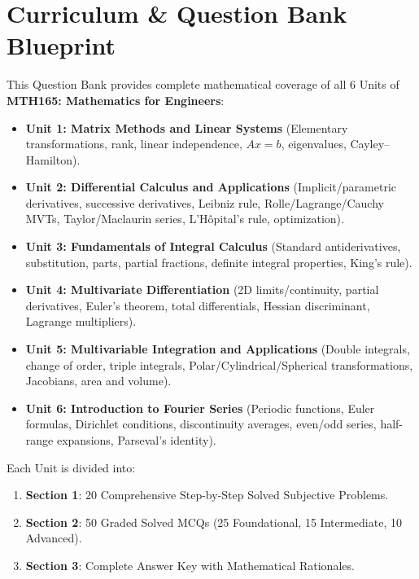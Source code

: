 \chapter*{Curriculum \& Question Bank Blueprint}

This Question Bank provides complete mathematical coverage of all 6 Units of \textbf{MTH165: Mathematics for Engineers}:
\begin{itemize}[leftmargin=1.5em]
    \item \textbf{Unit 1: Matrix Methods and Linear Systems} (Elementary transformations, rank, linear independence, $Ax=b$, eigenvalues, Cayley--Hamilton).
    \item \textbf{Unit 2: Differential Calculus and Applications} (Implicit/parametric derivatives, successive derivatives, Leibniz rule, Rolle/Lagrange/Cauchy MVTs, Taylor/Maclaurin series, L'H\^opital's rule, optimization).
    \item \textbf{Unit 3: Fundamentals of Integral Calculus} (Standard antiderivatives, substitution, parts, partial fractions, definite integral properties, King's rule).
    \item \textbf{Unit 4: Multivariate Differentiation} (2D limits/continuity, partial derivatives, Euler's theorem, total differentials, Hessian discriminant, Lagrange multipliers).
    \item \textbf{Unit 5: Multivariable Integration and Applications} (Double integrals, change of order, triple integrals, Polar/Cylindrical/Spherical transformations, Jacobians, area and volume).
    \item \textbf{Unit 6: Introduction to Fourier Series} (Periodic functions, Euler formulas, Dirichlet conditions, discontinuity averages, even/odd series, half-range expansions, Parseval's identity).
\end{itemize}

Each Unit is divided into:
\begin{enumerate}
    \item \textbf{Section 1}: 20 Comprehensive Step-by-Step Solved Subjective Problems.
    \item \textbf{Section 2}: 50 Graded Solved MCQs (25 Foundational, 15 Intermediate, 10 Advanced).
    \item \textbf{Section 3}: Complete Answer Key with Mathematical Rationales.
\end{enumerate}
\newpage
